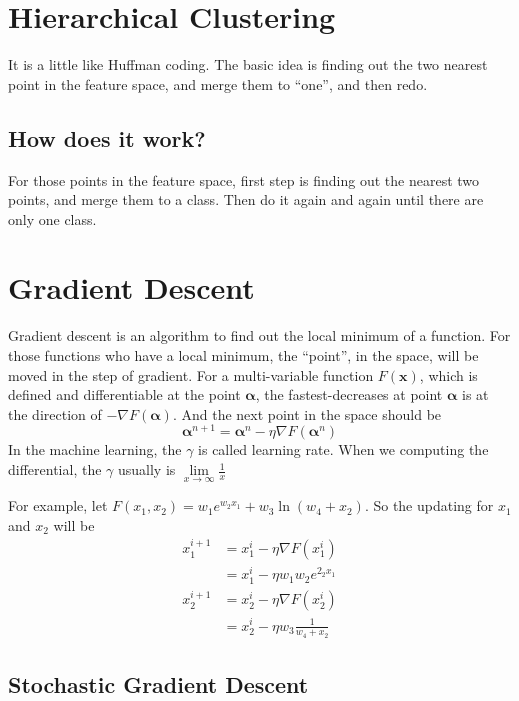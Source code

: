 \documentclass[twoside]{article}
\begin{document}
\section{Hierarchical Clustering}
\label{sec:hc}

It is a little like Huffman coding. The basic idea is finding out the two nearest point in the feature space, and merge them to ``one'', and then redo.

\subsection{How does it work?}
\label{sec:hc:how}

For those points in the feature space, first step is finding out the nearest two points, and merge them to a class.
Then do it again and again until there are only one class. 

\section{Gradient Descent}
\label{sec:gd}

Gradient descent is an algorithm to find out the local minimum of a function. For those functions who have a local minimum,
the ``point'', in the space, will be moved in the step of gradient.
For a multi-variable function $F(\mathbf{x})$, which is defined and differentiable at the point $\mathbf{\alpha}$, 
the fastest-decreases at point $\mathbf{\alpha}$ is at the direction of $-\nabla F(\mathbf{\alpha})$.
And the next point in the space should be
\begin{equation}
	\label{eq:gd:next}
	\mathbf{\alpha}^{n+1} = \mathbf{\alpha}^n - \eta\nabla F(\mathbf{\alpha}^n)
\end{equation}
In the machine learning, the $\gamma$ is called learning rate. When we computing the differential, the $\gamma$ usually is $\lim\limits_{x \rightarrow \infty} \frac{1}{x}$

For example, let $F(x_1,x_2)=w_1e^{w_2x_1}+w_3\ln(w_4+x_2)$. So the updating for $x_1$ and $ x_2$ will be 
\begin{align*}
x_1^{i+1} &= x_1^i - \eta\nabla F(x_1^i) \\ &= x_1^i - \eta w_1w_2e^{2_2x_1} \\
x_2^{i+1} &= x_2^i - \eta\nabla F(x_2^i) \\ &= x_2^i -\eta w_3\frac{1}{w_4+x_2}
\end{align*}

\subsection{Stochastic Gradient Descent}
\label{aec:gd:sgd}
\end{document}
